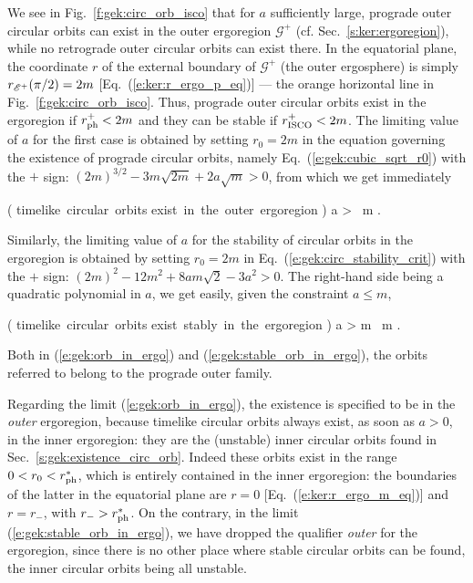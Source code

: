 We see in Fig.~\ref{f:gek:circ_orb_isco} that for $a$ sufficiently large,
prograde outer circular orbits can exist in the outer ergoregion $\mathscr{G}^+$
(cf. Sec.~\ref{s:ker:ergoregion}), while no retrograde outer circular orbits
can exist there.
In the equatorial plane, the coordinate $r$
of the external boundary of $\mathscr{G}^+$
(the outer ergosphere) is
simply $r_{\mathscr{E}^+}(\pi/2) = 2 m$ [Eq.~(\ref{e:ker:r_ergo_p_eq})] --- the orange
horizontal line in Fig.~\ref{f:gek:circ_orb_isco}.
Thus, prograde outer circular orbits exist in the ergoregion if
$r_{\rm ph}^+ < 2 m$ and they can be stable if $r_{\rm ISCO}^+ < 2 m$.
The limiting value of $a$ for the first case is obtained by setting
$r_0 = 2 m$ in the equation governing the existence of prograde circular orbits,
namely Eq.~(\ref{e:gek:cubic_sqrt_r0}) with the $+$ sign:
$(2m)^{3/2} - 3 m \sqrt{2m} + 2 a \sqrt{m} > 0$,
from which we get immediately
\begin{greybox}
\be \label{e:gek:orb_in_ergo}
    \left( {\mbox{timelike circular orbits}\atop
     \mbox{exist in the outer ergoregion}} \right)
     \iff a >  \, m .
\ee
\end{greybox}
Similarly, the limiting value of $a$ for the stability of
circular orbits in the ergoregion is obtained by setting $r_0 = 2m$ in
Eq.~(\ref{e:gek:circ_stability_crit}) with the $+$ sign:
$(2 m)^2 - 12 m^2 + 8 a m\sqrt{2} - 3 a^2 > 0$.
The right-hand side being a quadratic polynomial in $a$, we get
easily, given the constraint $a \leq m$,
\begin{greybox}
\be \label{e:gek:stable_orb_in_ergo}
    \left( {\mbox{timelike circular orbits}\atop
     \mbox{exist stably in the ergoregion}} \right)
     \iff a >  m \, m .
\ee
\end{greybox}
Both in (\ref{e:gek:orb_in_ergo}) and (\ref{e:gek:stable_orb_in_ergo}), the
orbits referred to belong to the prograde outer family.

\begin{remark}
Regarding the limit (\ref{e:gek:orb_in_ergo}), the existence is specified to
be in the \emph{outer} ergoregion, because timelike circular orbits always
exist, as soon as $a>0$, in the inner ergoregion: they are the (unstable) inner circular
orbits found in Sec.~\ref{s:gek:existence_circ_orb}. Indeed these orbits exist
in the range $0 < r_0 < r_{\rm ph}^*$, which is entirely contained in the
inner ergoregion: the boundaries of the latter in the equatorial plane are
$r=0$ [Eq.~(\ref{e:ker:r_ergo_m_eq})] and $r=r_-$, with $r_- > r_{\rm ph}^*$.
On the contrary, in the limit (\ref{e:gek:stable_orb_in_ergo}), we have
dropped the qualifier \emph{outer} for the ergoregion, since there is no other
place where stable circular orbits can be found, the inner circular orbits
being all unstable.
\end{remark}

